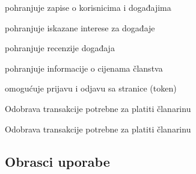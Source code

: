 \begin{packed_enum}
\begin{packed_enum}
\begin{packed_enum}
					\end{packed_enum}
					
				\end{packed_enum}
				
				\item  {}	
							
				\begin{packed_enum}				
				
					\item pohranjuje zapise o korisnicima i događajima
					\item pohranjuje iskazane interese za događaje
					\item pohranjuje recenzije događaja			
					\item pohranjuje informacije o cijenama članstva
					\item omogućuje prijavu i odjavu sa stranice (token)
				\end{packed_enum}

				\item  {}

				\begin{packed_enum}

				\item Odobrava transakcije potrebne za platiti članarinu

				\end{packed_enum}				
				
				\item  {}				
				
				\begin{packed_enum}
						
				\item Odobrava transakcije potrebne za platiti članarinu 					
					
				\end{packed_enum}
			    
			   
					

												
			\end{packed_enum}
			
	
			\eject 
			
			
				
			\subsection{Obrasci uporabe}
							
